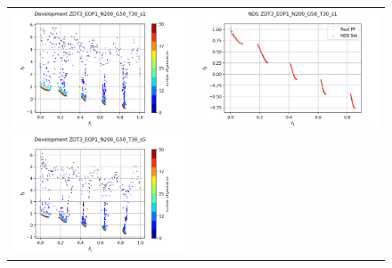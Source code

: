 \begin{figure}[H]
    \centering
    \begin{tabular}{c c}
    \includegraphics[scale=0.5]{figures/ZDT3_EOP1_N200_G50_T30/s1_dev.png} &
    \includegraphics[scale=0.5]{figures/ZDT3_EOP1_N200_G50_T30/s1_nds.png}\\
    \includegraphics[scale=0.5]{figures/ZDT3_EOP1_N200_G50_T30/s5_dev.png} &

\end{tabular}
\end{figure}
